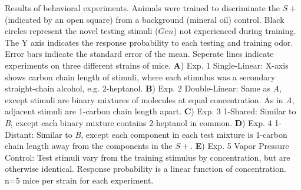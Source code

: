 \label{fig:results}
Results of behavioral experiments. Animals were trained to discriminate the $S+$ (indicated by an open square) from a background (mineral oil) control. Black circles represent the novel testing stimuli ($Gen$) not experienced during training. The Y axis indicates the response probability to each testing and training odor. Error bars indicate the standard error of the mean.  Seperate lines indicate experiments on three different strains of mice. \textbf{A}) Exp. 1 Single-Linear:  X-axis shows carbon chain length of stimuli, where each stimulus was a secondary straight-chain alcohol, e.g. 2-heptanol.  \textbf{B})  Exp. 2 Double-Linear: Same as \textit{A}, except stimuli are binary mixtures of molecules at equal concentration.  As in \textit{A}, adjacent stimuli are 1-carbon chain length apart. \textbf{C}) Exp. 3 1-Shared: Similar to \textit{B}, except each binary mixture contains 2-heptanol in common. \textbf{D})  Exp. 4 1-Distant: Similar to \textit{B}, except each component in each test mixture is 1-carbon chain length away from the components in the $S+$. \textbf{E}) Exp. 5 Vapor Pressure Control: Test stimuli vary from the training stimulus by concentration, but are otherwise identical. Response probability is a linear function of concentration.  n=5 mice per strain for each experiment.  